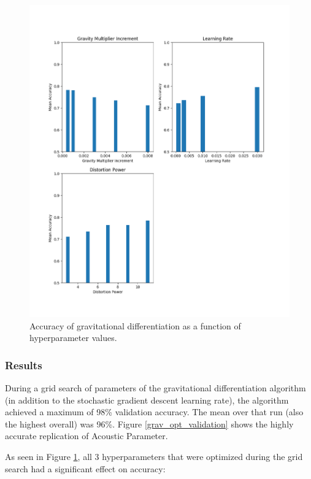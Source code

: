 \documentclass[10pt]{article}
\begin{document}
\begin{figure}[H]
    \centering
    \includegraphics[width=\textwidth]{grav_acc_by_hyper}
    \caption{\label{grav_acc_by_hyper} Accuracy of gravitational differentiation as a function of hyperparameter values.}
\end{figure}

\subsubsection{Results}

During a grid search of parameters of the gravitational differentiation algorithm (in addition to the stochastic gradient descent learning rate), the algorithm achieved a maximum of 98\% validation accuracy. The mean over that run (also the highest overall) was 96\%. Figure \ref{grav_opt_validation} shows the highly accurate replication of Acoustic Parameter.

As seen in Figure \ref{grav_acc_by_hyper}, all 3 hyperparameters that were optimized during the grid search had a significant effect on accuracy:
\end{document}
